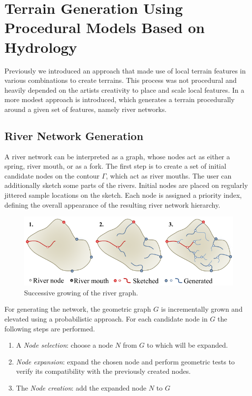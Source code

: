 \section{Terrain Generation Using Procedural Models Based on Hydrology}
\label{sec:Hydrology}
Previously we introduced an approach that made use of local terrain features in various combinations to create terrains. This process was not procedural and heavily depended on the artists creativity to place and scale local features. In \cite{Genevaux:2013:TGU:2461912.2461996} a more modest approach is introduced, which generates a terrain procedurally around a given set of features, namely river networks.
 
\subsection{River Network Generation}
A river network can be interpreted as a graph, whose nodes act as either a spring, river mouth, or as a fork. 
The first step is to create a set of initial candidate nodes on the contour $\Gamma$, which act as river mouths. The user can additionally sketch some parts of the rivers. Initial nodes are placed on regularly jittered sample locations on the sketch. Each node is assigned a priority index, defining the overall appearance of the resulting river network hierarchy. 

\begin{figure}[htb]
	\centering
	\includegraphics[width=\linewidth]{GGG13/river_network_sketch}
	\caption{Successive growing of the river graph. }
	\label{fig:river_network_sketch}
\end{figure}

For generating the network, the geometric graph $G$ is incrementally grown and elevated using a probabilistic approach. For each candidate node in $G$ the following steps are performed. 
\begin{enumerate}
	\item A \textit{Node selection}: choose a node $N$ from $G$ to which will be expanded.
	\item \textit{Node expansion}: expand the chosen node and perform geometric tests to verify its compatibility with the previously created nodes. 
	\item The \textit{Node creation}: add the expanded node $N$ to $G$ 
\end{enumerate}


